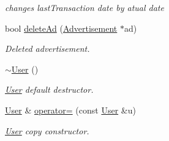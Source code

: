 \begin{DoxyCompactItemize}
\begin{DoxyCompactList}\small\item\em changes last\+Transaction date by atual date \end{DoxyCompactList}\item 
bool \hyperlink{class_user_a63aaced07bd60ebfede2b48874110bf6}{delete\+Ad} (\hyperlink{class_advertisement}{Advertisement} $\ast$ad)
\begin{DoxyCompactList}\small\item\em Deleted advertisement. \end{DoxyCompactList}\item 
\hypertarget{class_user_ac00b72ad64eb4149f7b21b9f5468c2b2}{}\hyperlink{class_user_ac00b72ad64eb4149f7b21b9f5468c2b2}{$\sim$\+User} ()\label{class_user_ac00b72ad64eb4149f7b21b9f5468c2b2}

\begin{DoxyCompactList}\small\item\em \hyperlink{class_user}{User} default destructor. \end{DoxyCompactList}\item 
\hypertarget{class_user_a2bedf75049198d6218bd77f6df897c99}{}\hyperlink{class_user}{User} \& \hyperlink{class_user_a2bedf75049198d6218bd77f6df897c99}{operator=} (const \hyperlink{class_user}{User} \&u)\label{class_user_a2bedf75049198d6218bd77f6df897c99}

\begin{DoxyCompactList}\small\item\em \hyperlink{class_user}{User} copy constructor. \end{DoxyCompactList}\end{DoxyCompactItemize}
